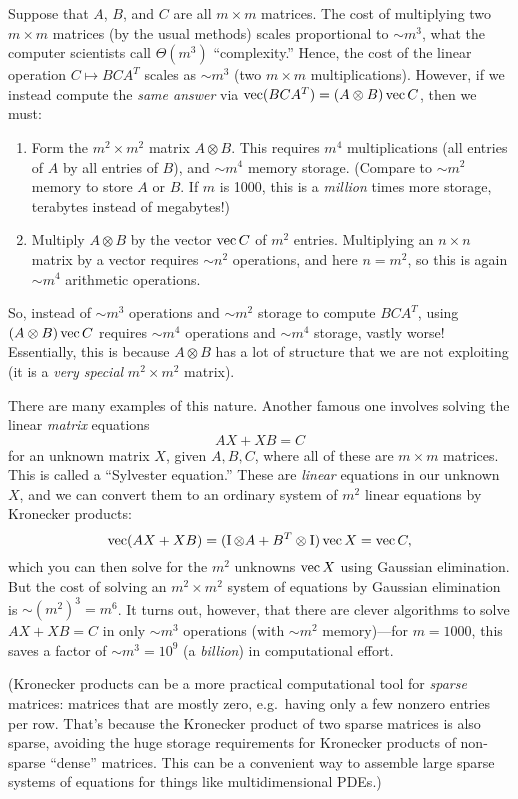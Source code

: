 Suppose that $A$, $B$, and $C$ are all $m\times m$ matrices. The
cost of multiplying two $m\times m$ matrices (by the usual methods)
scales proportional to $\sim m^{3}$, what the computer scientists
call $\Theta(m^{3})$ ``complexity.'' Hence, the cost of the linear
operation $C\mapsto BCA^{T}$ scales as $\sim m^{3}$ (two $m\times m$ multiplications).
However, if we instead compute the \emph{same answer} via $\operatorname{vec}(BCA^{T})=(A\otimes B)\operatorname{vec} C$,
then we must:
\begin{enumerate}
\item Form the $m^{2}\times m^{2}$ matrix $A\otimes B$. This requires
$m^{4}$ multiplications (all entries of $A$ by all entries of $B$),
and $\sim m^{4}$ memory storage. (Compare to $\sim m^{2}$ memory
to store $A$ or $B$. If $m$ is 1000, this is a \emph{million} times
more storage, terabytes instead of megabytes!)
\item Multiply $A\otimes B$ by the vector $\operatorname{vec} C$ of $m^{2}$ entries.
Multiplying an $n\times n$ matrix by a vector requires $\sim n^{2}$
operations, and here $n=m^{2}$, so this is again $\sim m^{4}$ arithmetic
operations.
\end{enumerate}
So, instead of $\sim m^{3}$ operations and $\sim m^{2}$ storage
to compute $BCA^{T}$, using $(A\otimes B)\operatorname{vec} C$ requires $\sim m^{4}$
operations and $\sim m^{4}$ storage, vastly worse! Essentially, this
is because $A\otimes B$ has a lot of structure that we are not exploiting
(it is a \emph{very special} $m^{2}\times m^{2}$ matrix). 

There are many examples of this nature. Another famous one involves
solving the linear \emph{matrix} equations 
\[
AX+XB=C
\]
for an unknown matrix $X$, given $A,B,C$, where all of these are
$m\times m$ matrices. This is called a ``Sylvester equation.'' These
are \emph{linear }equations in our unknown $X$, and we can convert them
to an ordinary system of $m^{2}$ linear equations by Kronecker products:
\[
\operatorname{vec}(AX+XB)=(\operatorname{I}\otimes A+B^{T}\otimes\operatorname{I})\operatorname{vec} X=\operatorname{vec} C,
\]
which you can then solve for the $m^{2}$ unknowns $\operatorname{vec} X$ using
Gaussian elimination. But the cost of solving an $m^{2}\times m^{2}$
system of equations by Gaussian elimination is $\sim (m^2)^3 = m^{6}$.
It turns out, however, that there are clever algorithms to solve $AX+XB=C$
in only $\sim m^{3}$ operations (with $\sim m^{2}$ memory)---for $m=1000$, this saves a factor of $\sim m^3 = {10}^9$ (a \emph{billion}) in computational effort.

(Kronecker products can be a more practical computational tool for \emph{sparse} matrices: matrices that are mostly zero, e.g.~having only a few nonzero entries per row.  That's because the Kronecker product of two sparse matrices is also sparse, avoiding the huge storage requirements for Kronecker products of non-sparse ``dense'' matrices. This can be a convenient way to assemble large sparse systems of equations for things like multidimensional PDEs.)